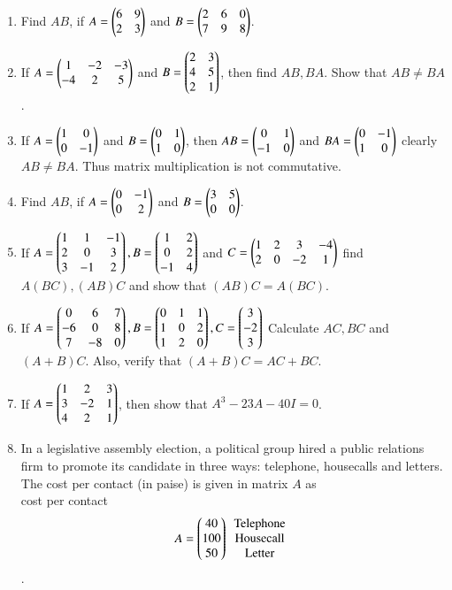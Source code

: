 \documentclass{article}
\theoremstyle{remark}
\begin{document}
\begin{enumerate}
\begin{enumerate}[label=(\roman*)]
\end{enumerate}
\item Find $AB$, if $A=\begin{pmatrix}6&9\\2&3\end{pmatrix}$ and $B=\begin{pmatrix}2&6&0\\7&9&8\end{pmatrix}$.
\item If $A=\begin{pmatrix}1&-2&-3\\ -4&2&5\end{pmatrix}$ and $B=\begin{pmatrix}2&3\\4&5\\2&1\end{pmatrix}$, then find $AB, BA$. Show that $AB\neq BA$.
\item If $A=\begin{pmatrix}1&0\\0&-1\end{pmatrix}$ and $B=\begin{pmatrix}0&1\\1&0\end{pmatrix}$, then $AB=\begin{pmatrix}0&1\\-1&0\end{pmatrix}$ and $BA=\begin{pmatrix}0&-1\\1&0\end{pmatrix}$ clearly $AB\neq BA$. Thus matrix multiplication is not commutative.
\item Find $AB$, if $A=\begin{pmatrix}0&-1\\0&2\end{pmatrix}$ and $B=\begin{pmatrix}3&5\\0&0\end{pmatrix}$.
\item If $A=\begin{pmatrix}1&1&-1\\2&0&3\\3&-1&2\end{pmatrix}, B=\begin{pmatrix}1&2\\0&2\\-1&4\end{pmatrix}$ and $C=\begin{pmatrix}1&2&3&-4\\2&0&-2&1\end{pmatrix}$ find $A(BC), (AB)C$ and show that $(AB)C = A(BC)$.
\item If $A=\begin{pmatrix}0&6&7\\-6&0&8\\7&-8&0\end{pmatrix}, B=\begin{pmatrix}0&1&1\\1&0&2\\1&2&0\end{pmatrix}, C=\begin{pmatrix}3\\-2\\3\end{pmatrix}$ Calculate $AC,BC$ and $(A+B)C$. Also,  verify that $(A+B)C=AC+BC$.
\item If $A=\begin{pmatrix}1&2&3\\3&-2&1\\4&2&1\end{pmatrix}$, then show that $A^3-23A-40I=0$.
\item In a legislative assembly election, a political group hired a public relations firm to promote its candidate in three ways: telephone, housecalls and letters. The cost per contact (in paise) is given in matrix $A$ as \\ cost per contact  
\begin{align} A=\begin{pmatrix}40\\100\\50\end{pmatrix}\begin{array}{c} \text{Telephone}\\ \text{Housecall}\\ \text{Letter}\end{array}\end{align}.

\end{enumerate}
\end{document}

